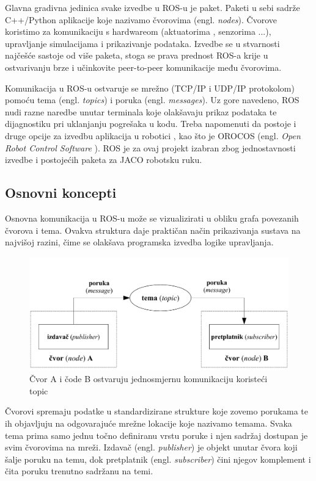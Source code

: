 \documentclass[times, utf8, diplomski, numeric]{fer}
\begin{document}
Glavna gradivna jedinica svake izvedbe u ROS-u je paket.
Paketi u sebi sadrže C++/Python aplikacije koje nazivamo čvorovima (engl. \textit{nodes}).
Čvorove koristimo za komunikaciju s hardwareom (aktuatorima , senzorima ...), upravljanje simulacijama i prikazivanje podataka.
Izvedbe se u stvarnosti najčešće sastoje od više paketa, stoga se prava prednost ROS-a krije u ostvarivanju brze i učinkovite peer-to-peer komunikacije među čvorovima.
 
Komunikacija u ROS-u ostvaruje se mrežno (TCP/IP i UDP/IP protokolom) pomoću tema (engl. \textit{topics}) i poruka (engl. \textit{messages}).
Uz gore navedeno, ROS nudi razne naredbe unutar terminala koje olakšavaju prikaz podataka te dijagnostiku pri uklanjanju pogrešaka u kodu. Treba napomenuti da postoje i druge opcije za izvedbu aplikacija u robotici , kao što je OROCOS (engl. \textit{Open Robot Control Software} ). ROS je za ovaj projekt izabran zbog jednostavnosti izvedbe i postojećih paketa za JACO robotsku ruku.
\subsection{Osnovni koncepti}
Osnovna komunikacija u ROS-u može se vizualizirati u obliku grafa povezanih čvorova i tema. Ovakva struktura daje praktičan način prikazivanja sustava na najvišoj razini, čime se olakšava programska izvedba logike upravljanja. 

\begin{figure}[h!]
\begin{center}
\includegraphics[width=\textwidth]{ros_shema}
\caption{Čvor A i čode B ostvaruju jednosmjernu komunikaciju koristeći topic}
\end{center}
\end{figure}

Čvorovi spremaju podatke u standardizirane strukture koje zovemo porukama te ih objavljuju na odgovarajuće mrežne lokacije koje nazivamo temama. 
Svaka tema prima samo jednu točno definiranu vrstu poruke i njen sadržaj dostupan je svim čvorovima na mreži.
Izdavač (engl. \textit{publisher}) je objekt unutar čvora koji šalje poruku na temu, dok pretplatnik (engl. \textit{subscriber}) čini njegov komplement i čita poruku trenutno sadržanu na temi.
\end{document}

